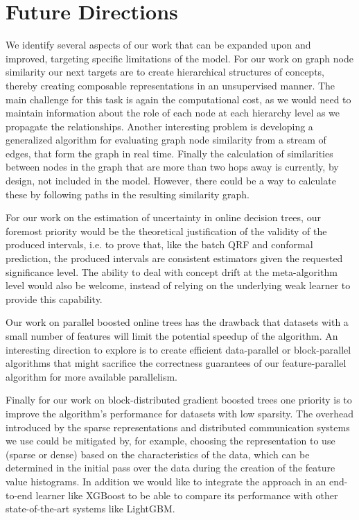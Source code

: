 \section{Future Directions}

We identify several aspects of our work that can be expanded upon and improved,
targeting specific limitations of the model. For our work on graph node similarity
our next targets are to create hierarchical structures of concepts, thereby creating
composable representations in an unsupervised manner. The main challenge for this
task is again the computational cost, as we would need to maintain information
about the role of each node at each hierarchy level as we propagate the relationships.
Another interesting problem is developing
a generalized algorithm for evaluating graph node similarity from a stream of edges,
that form the graph in real time. Finally the calculation of similarities between
nodes in the graph that are more than two hops away is currently, by design, not included
in the model. However, there could be a way to calculate these by following paths in
the resulting similarity graph.

For our work on the estimation of uncertainty in online decision trees, our foremost
priority would be the theoretical justification of the validity of the produced intervals,
i.e. to prove that, like the batch QRF and conformal prediction, the produced intervals
are consistent estimators given the requested significance level. The ability to
deal with concept drift at the meta-algorithm level would also be welcome, instead
of relying on the underlying weak learner to provide this capability.

Our work on parallel boosted online trees has the drawback that datasets with
a small number of features will limit the potential speedup of the
algorithm.
An interesting direction to explore is to
create efficient data-parallel or block-parallel algorithms that might sacrifice
the correctness guarantees of our feature-parallel algorithm for more available
parallelism.

Finally for our work on block-distributed gradient boosted trees one priority is to
improve the algorithm's performance for datasets with low sparsity. The overhead
introduced by the sparse representations and distributed communication systems we use could be mitigated by,
for example, choosing the representation to use (sparse or dense) based on the
characteristics of the data, which can be determined in the initial pass over the
data during the creation of the feature value histograms. In addition we would
like to integrate the approach in an end-to-end learner like XGBoost to be able
to compare its performance with other state-of-the-art systems like LightGBM.
